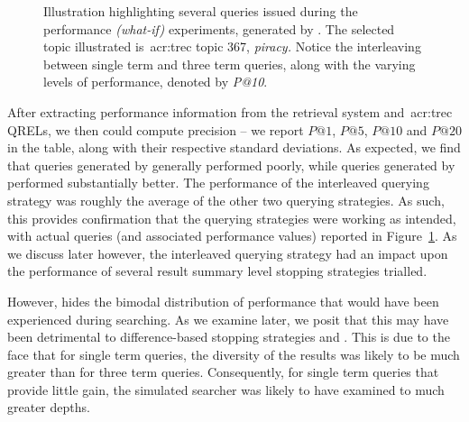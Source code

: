 \begin{figure}[t!]
    \centering
    \caption[Example queries issued]{Illustration highlighting several queries issued during the performance \emph{(what-if)} experiments, generated by . The selected topic illustrated is~\gls{acr:trec} topic 367, \emph{piracy.} Notice the interleaving between single term and three term queries, along with the varying levels of performance, denoted by \emph{P@10}.}
    \label{fig:ch7_example_queries}
\end{figure}

After extracting performance information from the retrieval system and~\gls{acr:trec} QRELs, we then could compute precision -- we report $P@1$, $P@5$, $P@10$ and $P@20$ in the table, along with their respective standard deviations. As expected, we find that queries generated by  generally performed poorly, while queries generated by  performed substantially better. The performance of the interleaved querying strategy  was roughly the average of the other two querying strategies. As such, this provides confirmation that the querying strategies were working as intended, with actual queries (and associated performance values) reported in Figure~\ref{fig:ch7_example_queries}. As we discuss later however, the interleaved querying strategy  had an impact upon the performance of several result summary level stopping strategies trialled.

However,  hides the bimodal distribution of performance that would have been experienced during searching. As we examine later, we posit that this may have been detrimental to difference-based stopping strategies  and . This is due to the face that for single term queries, the diversity of the results was likely to be much greater than for three term queries. Consequently, for single term queries that provide little gain, the simulated searcher was likely to have examined to much greater depths. 





